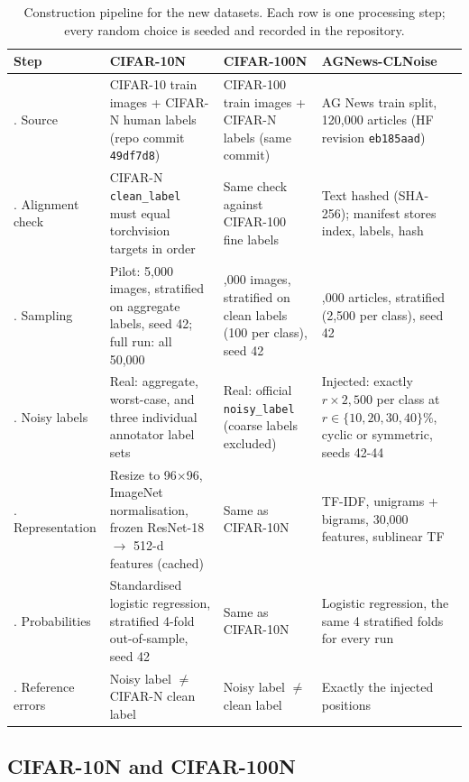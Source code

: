 \documentclass[11pt]{article}
\begin{document}
\begin{table}[t]
\centering
\small
\setlength{\tabcolsep}{4pt}
\begin{tabular}{>{\raggedright\arraybackslash}p{2.3cm}>{\raggedright\arraybackslash}p{4.15cm}>{\raggedright\arraybackslash}p{4.15cm}>{\raggedright\arraybackslash}p{4.15cm}}
\toprule
\textbf{Step} & \textbf{CIFAR-10N} & \textbf{CIFAR-100N} & \textbf{AGNews-CLNoise} \\
\midrule
1. Source &
CIFAR-10 train images + CIFAR-N human labels (repo commit \texttt{49df7d8}) &
CIFAR-100 train images + CIFAR-N labels (same commit) &
AG News train split, 120,000 articles (HF revision \texttt{eb185aad}) \\
2. Alignment check &
CIFAR-N \texttt{clean\_label} must equal torchvision targets in order &
Same check against CIFAR-100 fine labels &
Text hashed (SHA-256); manifest stores index, labels, hash \\
3. Sampling &
Pilot: 5,000 images, stratified on aggregate labels, seed 42; full run: all 50,000 &
10,000 images, stratified on clean labels (100 per class), seed 42 &
10,000 articles, stratified (2,500 per class), seed 42 \\
4. Noisy labels &
Real: aggregate, worst-case, and three individual annotator label sets &
Real: official \texttt{noisy\_label} (coarse labels excluded) &
Injected: exactly $r\times2{,}500$ per class at $r\in\{10,20,30,40\}\%$, cyclic or symmetric, seeds 42-44 \\
5. Representation &
Resize to 96$\times$96, ImageNet normalisation, frozen ResNet-18 $\rightarrow$ 512-d features (cached) &
Same as CIFAR-10N &
TF-IDF, unigrams + bigrams, 30,000 features, sublinear TF \\
6. Probabilities &
Standardised logistic regression, stratified 4-fold out-of-sample, seed 42 &
Same as CIFAR-10N &
Logistic regression, the same 4 stratified folds for every run \\
7. Reference errors &
Noisy label $\neq$ CIFAR-N clean label &
Noisy label $\neq$ clean label &
Exactly the injected positions \\
\bottomrule
\end{tabular}
\caption{Construction pipeline for the new datasets. Each row is one processing
step; every random choice is seeded and recorded in the repository.}
\label{tab:pipeline}
\end{table}

\subsection{CIFAR-10N and CIFAR-100N}
\end{document}
